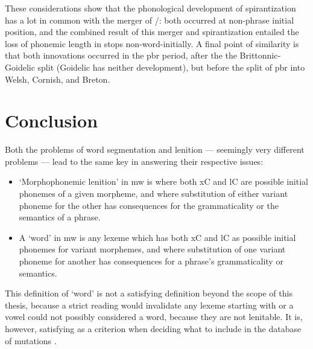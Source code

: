 These considerations show that the phonological development of spirantization has a lot in common with the merger of \xD/\lT: both occurred at non-phrase initial position, and the combined result of this merger and spirantization entailed the loss of phonemic length in stops non-word-initially.
A final point of similarity is that both innovations occurred in the \gls{pbr} period, after the the Brittonnic-Goidelic split (Goidelic has neither development), but before the split of \gls{pbr} into Welsh, Cornish, and Breton.

\section{Conclusion}

Both the problems of word segmentation and lenition --- seemingly very different problems --- lead to the same key in answering their respective issues: 
\begin{itemize}
    \item `Morphophonemic lenition' in \gls{mw} is where both \gls{x}\gls{C}  and \gls{l}\gls{C} are possible initial phonemes of a given morpheme, and where  substitution of either variant phoneme for the other has consequences for the grammaticality or the semantics of a phrase.
    \item A `word' in \gls{mw} is any lexeme which has both \gls{x}\gls{C} and \gls{l}\gls{C} as possible initial phonemes for variant morphemes, and where  substitution of one variant phoneme for another has consequences for a phrase's grammaticality or semantics.
\end{itemize}
This definition of `word' is not a satisfying definition beyond the scope of this thesis, because a strict reading would invalidate any lexeme starting with  or a vowel could not possibly considered a word, because they are not lenitable. It is, however, satisfying as a criterion when deciding what to include in the database of mutations .
